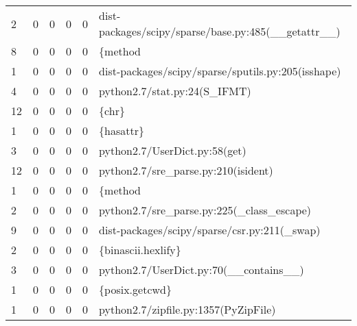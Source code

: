 \begin{tabular}{lrrrrl}
 2        &     0     &     0     &     0     &     0     & dist-packages/scipy/sparse/base.py:485(\_\_getattr\_\_)                      \\
 8        &     0     &     0     &     0     &     0     & \{method                                                                  \\
 1        &     0     &     0     &     0     &     0     & dist-packages/scipy/sparse/sputils.py:205(isshape)                       \\
 4        &     0     &     0     &     0     &     0     & python2.7/stat.py:24(S\_IFMT)                                             \\
 12       &     0     &     0     &     0     &     0     & \{chr\}                                                                    \\
 1        &     0     &     0     &     0     &     0     & \{hasattr\}                                                                \\
 3        &     0     &     0     &     0     &     0     & python2.7/UserDict.py:58(get)                                            \\
 12       &     0     &     0     &     0     &     0     & python2.7/sre\_parse.py:210(isident)                                      \\
 1        &     0     &     0     &     0     &     0     & \{method                                                                  \\
 2        &     0     &     0     &     0     &     0     & python2.7/sre\_parse.py:225(\_class\_escape)                                \\
 9        &     0     &     0     &     0     &     0     & dist-packages/scipy/sparse/csr.py:211(\_swap)                             \\
 2        &     0     &     0     &     0     &     0     & \{binascii.hexlify\}                                                       \\
 3        &     0     &     0     &     0     &     0     & python2.7/UserDict.py:70(\_\_contains\_\_)                                   \\
 1        &     0     &     0     &     0     &     0     & \{posix.getcwd\}                                                           \\
 1        &     0     &     0     &     0     &     0     & python2.7/zipfile.py:1357(PyZipFile)                                     \\

\end{tabular}
